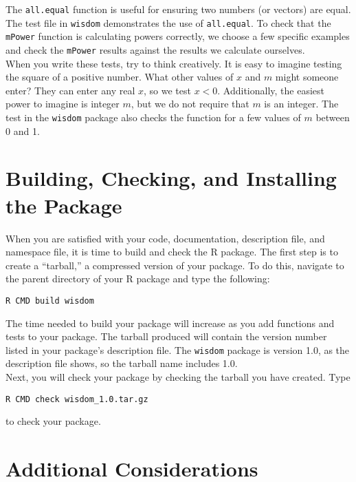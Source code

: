 \documentclass{article}
\begin{document}
 The \texttt{all.equal} function is useful for ensuring two numbers (or vectors) are equal. The test file in \texttt{wisdom} demonstrates the use of \texttt{all.equal}. To check that the \texttt{mPower} function is calculating  powers correctly, we choose a few specific examples and check the \texttt{mPower} results against the results we calculate ourselves.\\

 When you write these tests, try to think creatively. It is easy to imagine testing the square of a positive number. What other values of $x$ and $m$ might someone enter? They can enter any real $x$, so we test $x < 0$. Additionally, the easiest power to imagine is integer $m$, but we do not require that $m$ is an integer. The test in the \texttt{wisdom} package also checks  the function for a few values of $m$ between 0 and 1.\\








\section{Building, Checking, and Installing the Package}
When you are satisfied with your code, documentation, description file, and namespace file, it is time to build and check the R package. The first step is to create a ``tarball,'' a compressed version of your package. To do this, navigate to the parent directory of your R package and type the following:
\begin{verbatim}
R CMD build wisdom
\end{verbatim}
The time needed to build your package will increase as you add functions and tests to your package.  The tarball produced will contain the version number listed in your package's description file.  The \texttt{wisdom} package is version 1.0, as the description file shows, so the tarball name includes 1.0. \\

Next, you will check your package by checking the tarball you have created. Type
\begin{verbatim}
R CMD check wisdom_1.0.tar.gz 
\end{verbatim} 
to check your package. 

\section{Additional Considerations}
\end{document}
